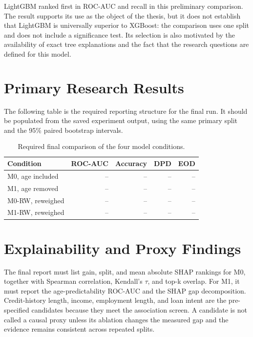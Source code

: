LightGBM ranked first in ROC-AUC and recall in this preliminary comparison.
The result supports its use as the object of the thesis, but it does not
establish that LightGBM is universally superior to XGBoost: the comparison
uses one split and does not include a significance test. Its selection is also
motivated by the availability of exact tree explanations and the fact that the
research questions are defined for this model.

\section{Primary Research Results}

The following table is the required reporting structure for the final run.
It should be populated from the saved experiment output, using the same
primary split and the 95\% paired bootstrap intervals.

\begin{table}[H]
\centering
\caption{Required final comparison of the four model conditions.}
\label{tab:final-results}
\begin{tabular}{lrrrr}
\toprule
\textbf{Condition} & \textbf{ROC-AUC} & \textbf{Accuracy} & \textbf{DPD}
& \textbf{EOD}\\
\midrule
M0, age included & -- & -- & -- & --\\
M1, age removed & -- & -- & -- & --\\
M0-RW, reweighed & -- & -- & -- & --\\
M1-RW, reweighed & -- & -- & -- & --\\
\bottomrule
\end{tabular}
\end{table}

\section{Explainability and Proxy Findings}

The final report must list gain, split, and mean absolute SHAP rankings for
M0, together with Spearman correlation, Kendall's $\tau$, and top-k overlap.
For M1, it must report the age-predictability ROC-AUC and the SHAP gap
decomposition. Credit-history length, income, employment length, and loan
intent are the pre-specified candidates because they meet the association
screen. A candidate is not called a causal proxy unless its ablation changes
the measured gap and the evidence remains consistent across repeated splits.

